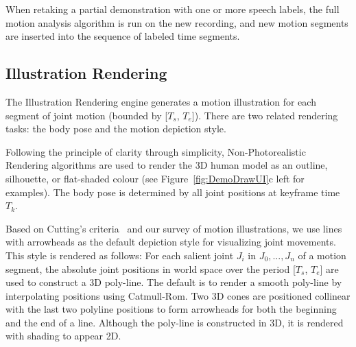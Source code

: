 When retaking a partial demonstration with one or more speech labels, the full motion analysis algorithm is run on the new recording, and new motion segments are inserted into the sequence of labeled time segments. %


\subsection{Illustration Rendering}

The Illustration Rendering engine generates a motion illustration for each segment of joint motion (bounded by [$T_s$, $T_e$]). There are two related rendering tasks: the body pose and the motion depiction style.

Following the principle of clarity through simplicity, Non-Photorealistic Rendering  \cite{gooch1998non} algorithms are used to render the 3D human model as an outline, silhouette, or flat-shaded colour (see Figure~\ref{fig:DemoDrawUI}c left for examples).
The body pose is determined by all joint positions at keyframe time $T_k$.

Based on Cutting's criteria~\cite{cutting_representing_2002} and our survey of motion illustrations, we use lines with arrowheads as the default depiction style for visualizing joint movements.
This style is rendered as follows:
%
For each salient joint \(J_i\) in \({J_0, ..., J_n}\) of a motion segment, the absolute joint positions in world space over the period [\(T_s\), \(T_e\)] are used to construct a 3D poly-line.
The default is to render a smooth poly-line by interpolating positions using Catmull-Rom.
Two 3D cones are positioned collinear with the last two polyline positions to form arrowheads for both the beginning and the end of a line.
%
Although the poly-line is constructed in 3D, it is rendered with shading to appear 2D.

